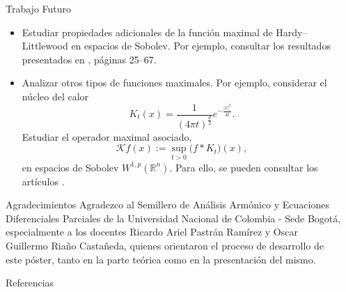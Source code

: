 \documentclass[final]{beamer}
\newlength{\sepwidth}
\newlength{\colwidth}
\newcommand{\separatorcolumn}{\begin{column}{\sepwidth}\end{column}}
\begin{document}
\begin{frame}[t]
\begin{columns}[t]
\begin{column}{\colwidth}
  \begin{exampleblock}{Trabajo Futuro}
   \begin{itemize}
     \item Estudiar propiedades adicionales de la función maximal de Hardy–Littlewood en espacios de Sobolev. Por ejemplo, consultar los resultados presentados en \cite{Mazya2009}, páginas 25–67.
     \item Analizar otros tipos de funciones maximales. Por ejemplo, considerar el núcleo del calor
     \begin{equation*}
        K_t(x)=\frac{1}{(4\pi t)^{\frac{d}{2}}}e^{-\frac{|x|^2}{4t}}. 
     \end{equation*}
     Estudiar el operador maximal asociado,
     \begin{equation*}
         \mathcal{K} f(x):=\sup_{t>0}\big(f\ast K_t\big)(x),
     \end{equation*}
     en espacios de Sobolev $W^{1,p}(\mathbb{R}^n)$. Para ello, se pueden consultar los artículos \cite{CarneiroFinderSousa2018,CarneiroBenar2013}.
  \end{itemize}
  \end{exampleblock}

  \begin{block}{Agradecimientos}
    Agradezco al Semillero de Análisis Armónico y Ecuaciones Diferenciales Parciales de la Universidad Nacional de Colombia - Sede Bogotá, especialmente a los docentes Ricardo Ariel Pastrán Ramírez y Oscar Guillermo Riaño Castañeda, quienes orientaron el proceso de desarrollo de este póster, tanto en la parte teórica como en la presentación del mismo.
  \end{block}

  \begin{block}{Referencias}

    \nocite{*}
    \footnotesize{
      
      
    }

  \end{block}

\end{column}
\separatorcolumn



\end{columns}
\end{frame}
\end{document}
